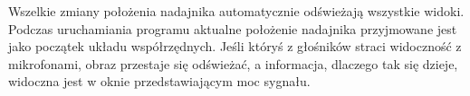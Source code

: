 Wszelkie zmiany położenia nadajnika automatycznie odświeżają wszystkie widoki. 
Podczas uruchamiania programu aktualne położenie nadajnika przyjmowane 
jest jako początek układu współrzędnych.
Jeśli któryś z głośników straci widoczność z mikrofonami, obraz przestaje się odświeżać, a informacja, dlaczego tak
się dzieje, widoczna jest w oknie przedstawiającym moc sygnału.



